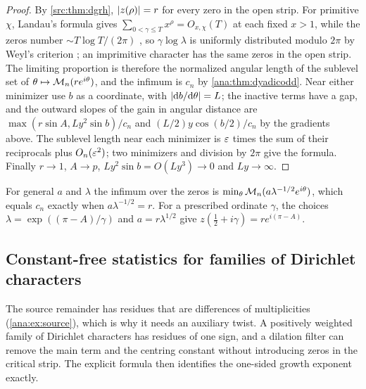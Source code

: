 \begin{proof}
By \cref{src:thm:dgrh}, $\lvert z(\rho)\rvert=r$ for every zero in the open strip. For primitive
$\chi$, Landau's formula gives $\sum_{0<\gamma\le T}x^\rho=O_{x,\chi}(T)$ at each fixed
$x>1$, while the zeros number $\sim T\log T/(2\pi)$ \cite{FordZaharescu2015Unnormalized}, so
$\gamma\log\lambda$ is uniformly distributed modulo $2\pi$ by Weyl's criterion
\cite{FordZaharescu2005Distribution}; an imprimitive character has the same zeros in the open
strip. The limiting proportion is therefore the normalized angular length of the sublevel set
of $\theta\mapsto\mathcal{M}_n(re^{i\theta})$, and the infimum is $c_n$ by
\cref{ana:thm:dyadicodd}. Near either minimizer use $b$ as a coordinate, with
$\lvert\mathrm{d} b/\mathrm{d}\theta\rvert=L$; the inactive terms have a gap, and the outward slopes of the
gain in angular distance are $\max(r\sin A,Ly^2\sin b)/c_n$ and $(L/2)y\cos(b/2)/c_n$ by the
gradients above. The sublevel length near each minimizer is $\varepsilon$ times the sum of their
reciprocals plus $O_n(\varepsilon^2)$; two minimizers and division by $2\pi$ give the formula.
Finally $r\to1$, $A\to p$, $Ly^2\sin b=O(Ly^3)\to0$ and $Ly\to\infty$.
\end{proof}

For general $a$ and $\lambda$ the infimum over the zeros is
$\min_\theta\mathcal{M}_n(a\lambda^{-1/2}e^{i\theta})$, which equals $c_n$ exactly when
$a\lambda^{-1/2}=r$. For a prescribed ordinate $\gamma$, the choices
$\lambda=\exp((\pi-A)/\gamma)$ and $a=r\lambda^{1/2}$ give $z(\frac12+i\gamma)=re^{i(\pi-A)}$.

\subsection{Constant-free statistics for families of Dirichlet characters}\label{ana:sec:family}
{\raggedright{}}

The source remainder has residues that are differences of multiplicities
(\cref{ana:ex:source}), which is why it needs an auxiliary twist. A positively weighted family
of Dirichlet characters has residues of one sign, and a dilation filter can remove the main
term and the centring constant without introducing zeros in the critical strip. The
explicit formula then identifies the one-sided growth exponent exactly.

